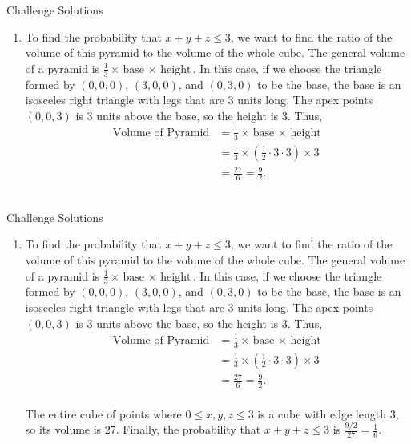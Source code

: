 \documentclass[9pt]{beamer}
\begin{document}
\begin{frame}[fragile, t]{Challenge Solutions}
    \begin{enumerate}
        \item To find the probability that $x+y+z\le 3$, we want to find the ratio of the volume of this pyramid to the volume of the whole cube. The general volume of a pyramid is $\frac{1}{3}\times\text{base $\times$ height}$. In this case, if we choose the triangle formed by $(0,0,0)$, $(3,0,0)$, and $(0,3,0)$ to be the base, the base is an isosceles right triangle with legs that are $3$ units long. The apex points $(0,0,3)$ is $3$ units above the base, so the height is $3$. Thus,
        \begin{align*}
            \text{Volume of Pyramid} &= \frac{1}{3}\times\text{base $\times$ height}\\
            &=\frac{1}{3}\times \left(\frac{1}{2}\cdot3\cdot3\right)\times 3\\
            &=\frac{27}{6}=\frac{9}{2}.
        \end{align*}\\
        \bigskip
    \end{enumerate}
    
\end{frame}




        
\begin{frame}[fragile, t]{Challenge Solutions}
    \begin{enumerate}
        \item To find the probability that $x+y+z\le 3$, we want to find the ratio of the volume of this pyramid to the volume of the whole cube. The general volume of a pyramid is $\frac{1}{3}\times\text{base $\times$ height}$. In this case, if we choose the triangle formed by $(0,0,0)$, $(3,0,0)$, and $(0,3,0)$ to be the base, the base is an isosceles right triangle with legs that are $3$ units long. The apex points $(0,0,3)$ is $3$ units above the base, so the height is $3$. Thus,
        \begin{align*}
            \text{Volume of Pyramid} &= \frac{1}{3}\times\text{base $\times$ height}\\
            &=\frac{1}{3}\times \left(\frac{1}{2}\cdot3\cdot3\right)\times 3\\
            &=\frac{27}{6}=\frac{9}{2}.
        \end{align*}\\
        \bigskip
        The entire cube of points where $0\le x,y,z\le 3$ is a cube with edge length $3$, so its volume is $27$. Finally, the probability that $x+y+z\le 3$ is $\frac{9/2}{27}=\frac{1}{6}$.
    \end{enumerate}
    
\end{frame}
\end{document}
